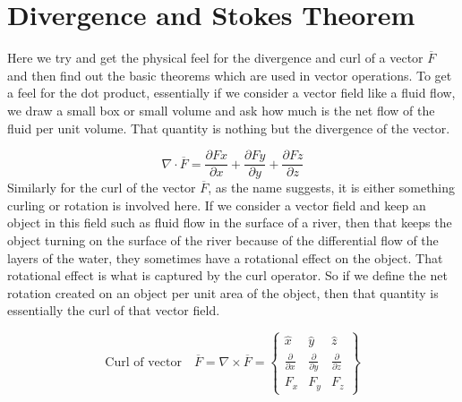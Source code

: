 \chapter{Divergence and Stokes Theorem}\label{lec:lec17}
Here we try and get the physical feel for the divergence and curl of a vector $\overline{F}$  and then find out the basic theorems which are used in vector operations.
To get a feel for the dot product, essentially if we consider a vector field like a fluid flow, we draw a small box or small volume and ask how much is the net flow of the fluid per unit volume. That quantity is nothing but the divergence of the vector.

\begin{equation}
\nabla\cdot \overline{F} = \frac{\partial Fx}{\partial x} + \frac{\partial Fy}{\partial y} + \frac{\partial Fz}{\partial z}	
\end{equation}
Similarly for the curl of the vector $\overline{F}$, as the name suggests, it is either something curling or rotation is involved here. If we consider a vector field and keep an object in this field such as fluid flow in the surface of a river, then that keeps the object turning on the surface of the river because of the differential flow of the layers of the water, they sometimes have a rotational effect on the object. That rotational effect is what is captured by the curl operator. So if we define the net rotation created on an object per unit area of the object, then that quantity is essentially the curl of that vector field.

\begin{dmath*}
	\text{Curl of vector} \quad \overline{F} = \nabla \times \overline{F} = 
	\begin{Bmatrix}
		\hat{x} & \hat{y} & \hat{z}\\
		\frac{\partial}{\partial x} & \frac{\partial}{\partial y} & \frac{\partial}{\partial z}\\
		F_{x} & F_{y} & F_{z}
	\end{Bmatrix}
\end{dmath*}

